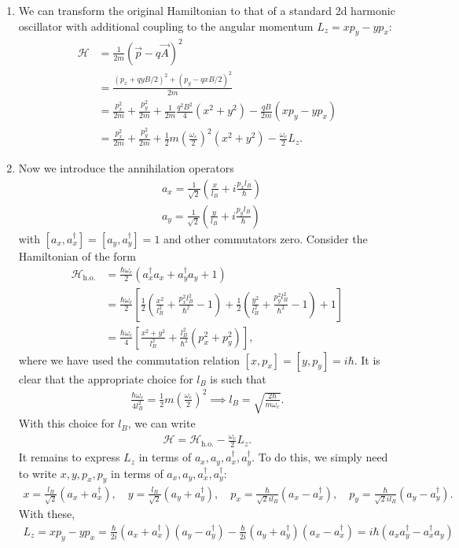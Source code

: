 \documentclass{article}
\theoremstyle{definition}
\newcommand{\ham}{\mathcal{H}}
\newcommand{\f}[2]{\frac{#1}{#2}}
\newcommand{\lp}{\left(}
\newcommand{\rp}{\right)}
\newcommand{\lb}{\left[}
\newcommand{\rb}{\right]}
\begin{document}
\begin{enumerate}[label=\alph*)]
	
	\item We can transform the original Hamiltonian to that of a standard 2d harmonic oscillator with additional coupling to the angular momentum $L_z = xp_y - yp_x$:
	\begin{align*}
		\ham 
		&= \f{1}{2m}\lp \vec{p} - q\vec{A} \rp^2 \\
		&=  \f{({p}_x + q yB/2)^2 + ({p}_y - q x B/2)^2}{2m} \\
		&= \f{p_x^2}{2m} + \f{p_y^2}{2m} + \f{1}{2m}\f{q^2B^2}{4}(x^2 + y^2) - \f{qB}{2m} (xp_y - yp_x)\\
		&= \f{p_x^2}{2m} + \f{p_y^2}{2m} + \f{1}{2} m \lp \f{\omega_c}{2} \rp^2 (x^2 + y^2) - \f{\omega_c}{2}L_z.
	\end{align*}
	
	\item Now we introduce the annihilation operators
	\begin{align*}
		&a_x = \f{1}{\sqrt{2}}\lp \f{x}{l_B} + i \f{p_x l_B}{\hbar} \rp \\ 
		&a_y = \f{1}{\sqrt{2}}\lp \f{y}{l_B} + i \f{p_y l_B}{\hbar} \rp
	\end{align*}
	with $[a_x,a^\dagger_x] = [a_y,a^\dagger_y] = 1$  and other commutators zero. Consider the Hamiltonian of the form 
	\begin{align*}
		\ham_{\text{h.o.}} 
		&= \f{\hbar \omega_c}{2} \lp a_x^\dagger a_x + a_y^\dagger a_y + 1 \rp\\
		&= \f{\hbar \omega_c}{2} \lb \f{1}{2}\lp \f{x^2}{l_B^2} + \f{p_x^2 l_B^2}{\hbar^2} - 1 \rp + \f{1}{2}\lp \f{y^2}{l_B^2} + \f{p_y^2 l_B^2}{\hbar^2} -1 \rp + 1 \rb \\ 
		&= \f{\hbar \omega_c}{4}\lb \f{x^2 + y^2}{l_B^2} + \f{l_B^2}{\hbar^2}(p_x^2 + p_y^2) \rb,
	\end{align*}
	where we have used the commutation relation $[x,p_x] = [y,p_y] = i\hbar$. It is clear that the appropriate choice for $l_B$ is such that
	\begin{align*}
		\f{\hbar \omega_c}{4l_B^2} = \f{1}{2}m\lp \f{\omega_c}{2} \rp^2 \implies l_B = \sqrt{\f{2\hbar }{m\omega_c}}.
	\end{align*}
	With this choice for $l_B$, we can write
	\begin{align*}
		\ham = \ham_\text{h.o.} - \f{\omega_c}{2}L_z.
	\end{align*}
	It remains to express $L_z$ in terms of $a_x,a_y,a_x^\dagger, a_y^\dagger$. To do this, we simply need to write $x,y,p_x,p_y$ in terms of $a_x,a_y,a_x^\dagger, a_y^\dagger$:
	\begin{align*}
		x = \f{l_B}{\sqrt{2}}\lp a_x + a_x^\dagger \rp, \quad y = \f{l_B}{\sqrt{2}}\lp a_y + a_y^\dagger \rp, \quad 
		p_x = \f{\hbar}{\sqrt{2} il_B} \lp a_x - a_x^\dagger \rp, \quad p_y = \f{\hbar}{\sqrt{2} il_B} \lp a_y - 		a_y^\dagger\rp.
	\end{align*}
	With these,
	\begin{align*}
		L_z = xp_y - yp_x = \f{\hbar}{2i}\lp a_x + a_x^\dagger \rp\lp a_y - a_y^\dagger\rp - \f{\hbar}{2i}\lp a_y + a_y^\dagger \rp \lp a_x - a_x^\dagger \rp = i\hbar(a_xa_y^\dagger - a_x^\dagger a_y)
	\end{align*}
	

\end{enumerate}
\end{document}
